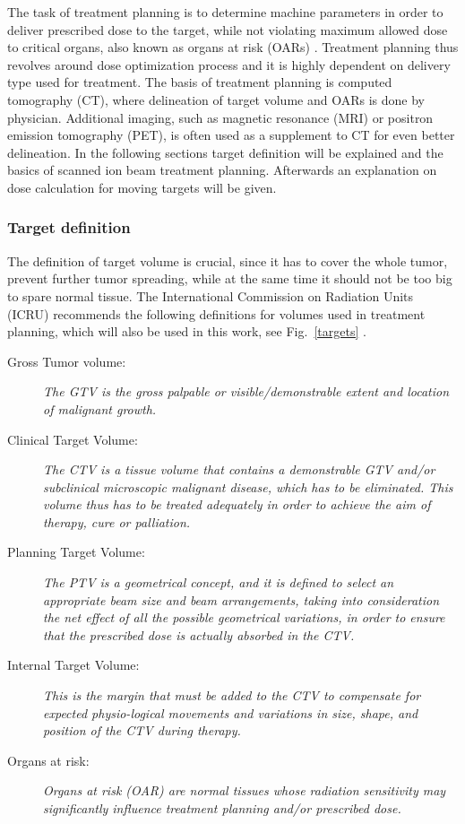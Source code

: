 \documentclass[type=dr, dr=rernat, accentcolor=tud7b,colorbacktitle, bigchapter, openright, twoside, 12pt ]{tudthesis}
\begin{document}
The task of treatment planning is to determine machine parameters in order to deliver prescribed dose to the target, while not violating maximum allowed dose to critical organs, also known as organs at risk (OARs) \cite{Richter2012}.
Treatment planning thus revolves around dose optimization process and it is highly dependent on delivery type used for treatment. The basis of treatment planning is computed tomography (CT), where delineation of target volume and OARs is
done by physician. Additional imaging, such as magnetic resonance (MRI) or positron emission tomography (PET), is often used as a supplement to CT for even better delineation. In the following sections target definition will be explained and the basics of scanned ion beam treatment planning. Afterwards an explanation on dose calculation for moving targets will be given.

\subsubsection{Target definition}
The definition of target volume is crucial, since it has to cover the whole tumor, prevent further tumor spreading, while at the same time it should not be too big to spare normal tissue. 
The International Commission on Radiation Units (ICRU) recommends the following definitions for volumes used in treatment planning, which will also be used in this work, see Fig.~\ref{targets} \cite{ICRU50, ICRU62}.

\begin{description}
\item[Gross Tumor volume:] \emph{The GTV is the gross
    palpable or visible/demonstrable extent and location of malignant
    growth.}
\item[Clinical Target Volume:] \emph{The CTV is a tissue
    volume that contains a demonstrable GTV and/or subclinical
    microscopic malignant disease, which has to be eliminated. This
    volume thus has to be treated adequately in order to achieve the
    aim of therapy, cure or palliation.}
\item[Planning Target Volume:] \emph{The PTV is a geometrical
    concept, and it is defined to select an appropriate beam size and
    beam arrangements, taking into consideration the net effect of all
    the possible geometrical variations, in order to ensure that the
    prescribed dose is actually absorbed in the CTV.}
\item[Internal Target Volume:] \emph{This is the margin that must be
    added to the CTV to compensate for expected physio-logical
    movements and variations in size, shape, and position of the
    CTV during therapy.}
\item[Organs at risk:] \emph{Organs at risk (OAR) are normal
    tissues whose radiation sensitivity may significantly influence
    treatment planning and/or prescribed dose.}
\end{description}
\end{document}
